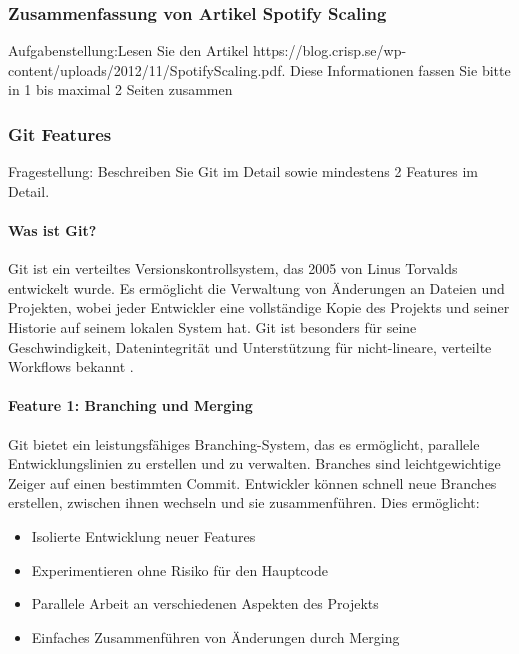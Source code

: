 

\subsubsection{Zusammenfassung von Artikel Spotify Scaling}

Aufgabenstellung:Lesen Sie den Artikel https://blog.crisp.se/wp-content/uploads/2012/11/SpotifyScaling.pdf.
Diese Informationen fassen Sie bitte in 1 bis maximal 2 Seiten zusammen


\subsubsection{Git Features}

Fragestellung: Beschreiben Sie Git im Detail sowie mindestens 2 Features im Detail.

\paragraph{Was ist Git?}
Git ist ein verteiltes Versionskontrollsystem, das 2005 von Linus Torvalds entwickelt wurde.
Es ermöglicht die Verwaltung von Änderungen an Dateien und Projekten,
wobei jeder Entwickler eine vollständige Kopie des Projekts und seiner Historie auf seinem lokalen System hat.
Git ist besonders für seine Geschwindigkeit, Datenintegrität und Unterstützung für nicht-lineare, verteilte Workflows bekannt \cite{github-git}.

\paragraph{Feature 1: Branching und Merging}
Git bietet ein leistungsfähiges Branching-System, das es ermöglicht, parallele Entwicklungslinien zu erstellen und zu verwalten.
Branches sind leichtgewichtige Zeiger auf einen bestimmten Commit. Entwickler können schnell neue Branches erstellen,
zwischen ihnen wechseln und sie zusammenführen. Dies ermöglicht:

    \begin{itemize}
        \item Isolierte Entwicklung neuer Features
        \item Experimentieren ohne Risiko für den Hauptcode
        \item Parallele Arbeit an verschiedenen Aspekten des Projekts
        \item Einfaches Zusammenführen von Änderungen durch Merging
    \end{itemize}

